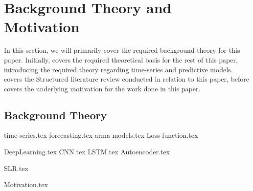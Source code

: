 \chapter{Background Theory and Motivation}\label{T-B}
\label{cha:TheoryAndBackground}


In this section, we will primarily cover the required background theory for this paper.
Initially,  covers the required theoretical basis for the rest of this paper,
introducing the required theory regarding time-series and predictive models.
 covers the Structured literature review conducted in relation to this paper,
before  covers the underlying motivation for the work done in this paper.
 


\section{Background Theory}
\label{section:BT:BackgroundTheory}
{time-series.tex}
{forecasting.tex}
{arma-models.tex}
{Loss-function.tex}

{DeepLearning.tex}
{CNN.tex}
{LSTM.tex}
{Autoencoder.tex}



{SLR.tex}


{Motivation.tex}
